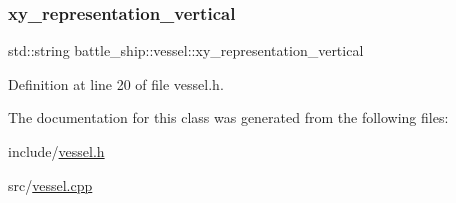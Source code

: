 \subsubsection{\texorpdfstring{xy\+\_\+representation\+\_\+vertical}{xy\_representation\_vertical}}
{\footnotesize\ttfamily std\+::string battle\+\_\+ship\+::vessel\+::xy\+\_\+representation\+\_\+vertical\hspace{0.3cm}{\ttfamily [protected]}}



Definition at line 20 of file vessel.\+h.



The documentation for this class was generated from the following files\+:\begin{DoxyCompactItemize}
\item 
include/\hyperlink{vessel_8h}{vessel.\+h}\item 
src/\hyperlink{vessel_8cpp}{vessel.\+cpp}\end{DoxyCompactItemize}

